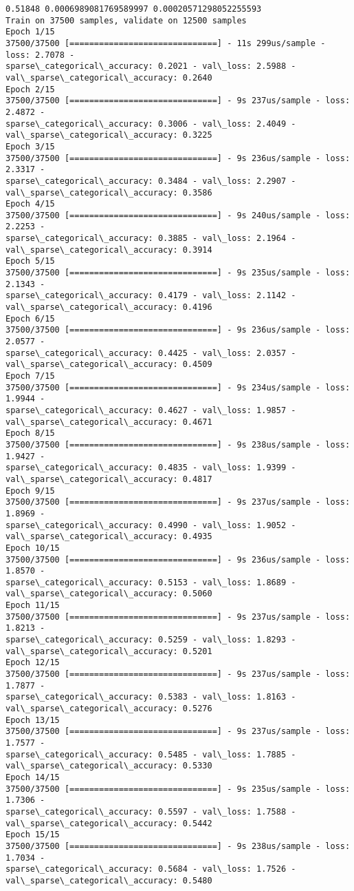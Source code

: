 \documentclass[11pt]{article}
\begin{document}
    \begin{Verbatim}[commandchars=\\\{\}]
0.51848 0.0006989081769589997 0.00020571298052255593
Train on 37500 samples, validate on 12500 samples
Epoch 1/15
37500/37500 [==============================] - 11s 299us/sample - loss: 2.7078 -
sparse\_categorical\_accuracy: 0.2021 - val\_loss: 2.5988 -
val\_sparse\_categorical\_accuracy: 0.2640
Epoch 2/15
37500/37500 [==============================] - 9s 237us/sample - loss: 2.4872 -
sparse\_categorical\_accuracy: 0.3006 - val\_loss: 2.4049 -
val\_sparse\_categorical\_accuracy: 0.3225
Epoch 3/15
37500/37500 [==============================] - 9s 236us/sample - loss: 2.3317 -
sparse\_categorical\_accuracy: 0.3484 - val\_loss: 2.2907 -
val\_sparse\_categorical\_accuracy: 0.3586
Epoch 4/15
37500/37500 [==============================] - 9s 240us/sample - loss: 2.2253 -
sparse\_categorical\_accuracy: 0.3885 - val\_loss: 2.1964 -
val\_sparse\_categorical\_accuracy: 0.3914
Epoch 5/15
37500/37500 [==============================] - 9s 235us/sample - loss: 2.1343 -
sparse\_categorical\_accuracy: 0.4179 - val\_loss: 2.1142 -
val\_sparse\_categorical\_accuracy: 0.4196
Epoch 6/15
37500/37500 [==============================] - 9s 236us/sample - loss: 2.0577 -
sparse\_categorical\_accuracy: 0.4425 - val\_loss: 2.0357 -
val\_sparse\_categorical\_accuracy: 0.4509
Epoch 7/15
37500/37500 [==============================] - 9s 234us/sample - loss: 1.9944 -
sparse\_categorical\_accuracy: 0.4627 - val\_loss: 1.9857 -
val\_sparse\_categorical\_accuracy: 0.4671
Epoch 8/15
37500/37500 [==============================] - 9s 238us/sample - loss: 1.9427 -
sparse\_categorical\_accuracy: 0.4835 - val\_loss: 1.9399 -
val\_sparse\_categorical\_accuracy: 0.4817
Epoch 9/15
37500/37500 [==============================] - 9s 237us/sample - loss: 1.8969 -
sparse\_categorical\_accuracy: 0.4990 - val\_loss: 1.9052 -
val\_sparse\_categorical\_accuracy: 0.4935
Epoch 10/15
37500/37500 [==============================] - 9s 236us/sample - loss: 1.8570 -
sparse\_categorical\_accuracy: 0.5153 - val\_loss: 1.8689 -
val\_sparse\_categorical\_accuracy: 0.5060
Epoch 11/15
37500/37500 [==============================] - 9s 237us/sample - loss: 1.8213 -
sparse\_categorical\_accuracy: 0.5259 - val\_loss: 1.8293 -
val\_sparse\_categorical\_accuracy: 0.5201
Epoch 12/15
37500/37500 [==============================] - 9s 237us/sample - loss: 1.7877 -
sparse\_categorical\_accuracy: 0.5383 - val\_loss: 1.8163 -
val\_sparse\_categorical\_accuracy: 0.5276
Epoch 13/15
37500/37500 [==============================] - 9s 237us/sample - loss: 1.7577 -
sparse\_categorical\_accuracy: 0.5485 - val\_loss: 1.7885 -
val\_sparse\_categorical\_accuracy: 0.5330
Epoch 14/15
37500/37500 [==============================] - 9s 235us/sample - loss: 1.7306 -
sparse\_categorical\_accuracy: 0.5597 - val\_loss: 1.7588 -
val\_sparse\_categorical\_accuracy: 0.5442
Epoch 15/15
37500/37500 [==============================] - 9s 238us/sample - loss: 1.7034 -
sparse\_categorical\_accuracy: 0.5684 - val\_loss: 1.7526 -
val\_sparse\_categorical\_accuracy: 0.5480
    \end{Verbatim}
\end{document}
